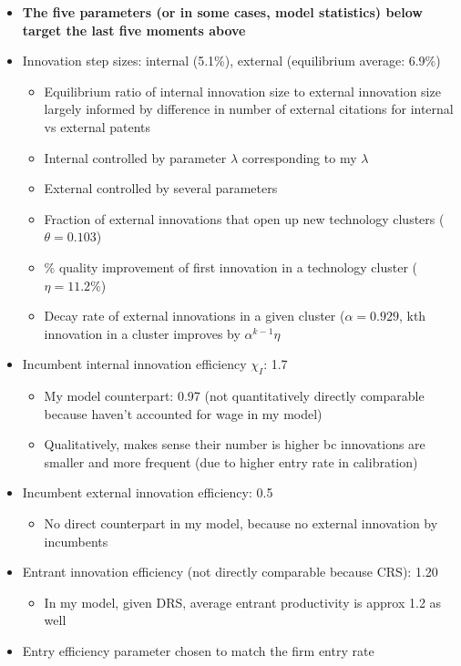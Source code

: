 \documentclass[12pt,english]{article}
\theoremstyle{remark}
\begin{document}
\begin{itemize}
\begin{itemize}
\begin{itemize}
			\item \textbf{The five parameters (or in some cases, model statistics) below target the last five moments above}
			\item Innovation step sizes: internal (5.1\%), external (equilibrium average: 6.9\%)
			\begin{itemize}
				\item Equilibrium ratio of internal innovation size to external innovation size largely informed by difference in number of external citations for internal vs external patents
				\item Internal controlled by parameter $\lambda$ corresponding to my $\lambda$
				\item External controlled by several parameters
				\item Fraction of external innovations that open up new technology clusters ($\theta =  0.103$)
				\item \% quality improvement of first innovation in a technology cluster ($\eta = 11.2\%$)
				\item Decay rate of external innovations in a given cluster ($\alpha = 0.929$, kth innovation in a cluster improves by $\alpha^{k-1} \eta$
			\end{itemize}
			\item Incumbent internal innovation efficiency $\chi_I$: 1.7
			\begin{itemize}
				\item My model counterpart: 0.97 (not quantitatively directly comparable because haven't accounted for wage in my model)
				\item Qualitatively, makes sense their number is higher bc innovations are smaller and more frequent (due to higher entry rate in calibration)
			\end{itemize}
			\item Incumbent external innovation efficiency: 0.5
			\begin{itemize}
				\item No direct counterpart in my model, because no external innovation by incumbents
			\end{itemize}
			\item Entrant innovation efficiency (not directly comparable because CRS): 1.20
			\begin{itemize}
				\item In my model, given DRS, average entrant productivity is approx 1.2 as well
			\end{itemize}
			\item Entry efficiency parameter chosen to match the firm entry rate

\end{itemize}
\end{itemize}
\end{itemize}
\end{document}
